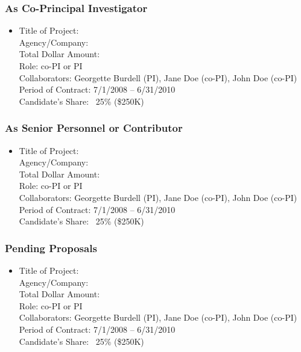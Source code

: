 \begin{adjustwidth}{2em}{0pt}
\subsubsection{As Co-Principal Investigator}

\begin{itemize}
    \item 
    Title of Project: \\ 
    Agency/Company: \\ 
    Total Dollar Amount:  \\ 
    Role: co-PI or PI \\ 
    Collaborators: Georgette Burdell (PI), Jane Doe (co-PI), John Doe (co-PI) \\ 
    Period of Contract: 7/1/2008 – 6/31/2010 \\ 
    Candidate’s Share: ~25\% (\$250K)
\end{itemize}

\subsubsection{As Senior Personnel or Contributor}

\begin{itemize}
    \item 
    Title of Project: \\ 
    Agency/Company: \\ 
    Total Dollar Amount:  \\ 
    Role: co-PI or PI \\ 
    Collaborators: Georgette Burdell (PI), Jane Doe (co-PI), John Doe (co-PI) \\ 
    Period of Contract: 7/1/2008 – 6/31/2010 \\ 
    Candidate’s Share: ~25\% (\$250K)
\end{itemize}

\subsubsection{Pending Proposals}

\begin{itemize}
    \item 
    Title of Project: \\ 
    Agency/Company: \\ 
    Total Dollar Amount:  \\ 
    Role: co-PI or PI \\ 
    Collaborators: Georgette Burdell (PI), Jane Doe (co-PI), John Doe (co-PI) \\ 
    Period of Contract: 7/1/2008 – 6/31/2010 \\ 
    Candidate’s Share: ~25\% (\$250K)
\end{itemize}


\end{adjustwidth}
